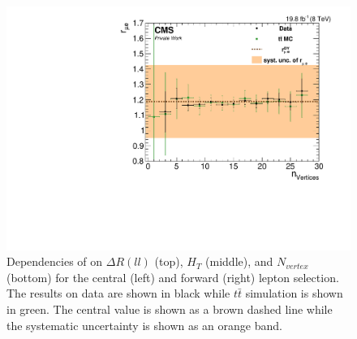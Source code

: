 \begin{figure}[htbp]
\begin{minipage}[t]{0.49\textwidth}
\includegraphics[width=\textwidth]{plots/BG/rmue/8TeVrRatioDataVsMCControl_nVertices_Forward_Full2012.pdf}
\end{minipage}
\caption{Dependencies of \rmue on $\Delta R(ll)$ (top), $H_T$ (middle), and $N_{vertex}$ (bottom) for the central (left) and forward (right) lepton selection. The results on data are shown in black while $t\bar{t}$ simulation is shown in green. The central value is shown as a brown dashed line while the systematic uncertainty is shown as an orange band.}
\label{fig:rmueDependenciesApp2}
\end{figure} 

